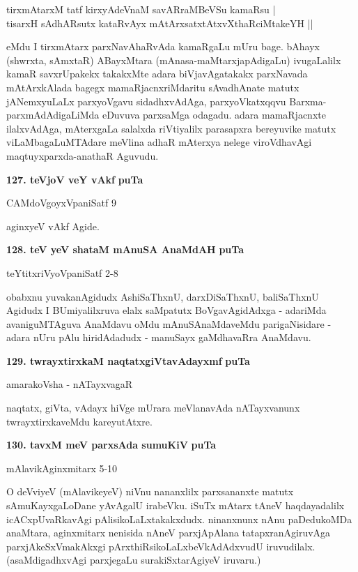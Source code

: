 \smallskip
\begin{shloka}
tirxmAtarxM tatf kirxyAdeVnaM savARraMBeVSu kamaRsu |\\
tisarxH sAdhARsutx kataRvAyx mAtArxsatxtAtxvXthaRciMtakeYH ||
\end{shloka}

eMdu I tirxmAtarx parxNavAhaRvAda kamaRgaLu mUru bage. bAhayx (shwrxta, sAmxtaR) ABayxM\-tara (mAnasa-maMtarxjapAdigaLu) ivugaLalilx kamaR savxrUpakekx takakxMte adara biVjavAgatakakx parxNavada mAtArx\-kAlada bagegx mamaRjacnxriMdaritu sAvadhAnate matutx jANemxyuLaLx parxyoVgavu sidadhxvAdAga, parxyoV\-katxqqvu Barxma-parxmAdAdigaLiMda eDuvuva parxsaMga odagadu. adara mamaRjacnxte ilalxvAdAga, mAterxgaLa salalxda riVtiyalilx parasapxra bereyuvike matutx viLaMbagaLuMTAdare meVlina adhaR mAterxya nelege viroVdhavAgi maqtuyxparxda-anathaR Aguvudu.

\medskip
\noindent
\textbf{127. teVjoV veY vAkf} \hfill{\bf puTa \pageref{212}}

\hfill{CAMdoVgoyxVpaniSatf 9}

aginxyeV vAkf Agide.

\medskip
\noindent
\textbf{128. teV yeV shataM mAnuSA AnaMdAH} \hfill{\bf puTa \pageref{166}}

\hfill{teYtitxriVyoVpaniSatf 2-8}

obabxnu yuvakanAgidudx AshiSaThxnU, darxDiSaThxnU, baliSaThxnU Agidudx I BUmiyalilxruva elalx saMpatutx\- BoVgavAgidAdxga - adariMda avaniguMTAguva AnaMdavu oMdu mAnuSAnaMdaveMdu parigaNisidare - adara nUru pAlu hiridAdadudx - manuSayx gaMdhavaRra AnaMdavu.

\eject

\noindent
\textbf{129. twrayxtirxkaM naqtatxgiVtavAdayxmf} \hfill{\bf puTa \pageref{241}}

\hfill{amarakoVsha - nATayxvagaR}

\smallskip
naqtatx, giVta, vAdayx hiVge mUrara meVlanavAda nATayxvanunx twrayxtirxkaveMdu kareyutAtxre.

\medskip
\noindent
\textbf{130. tavxM meV parxsAda sumuKiV} \hfill{\bf puTa \pageref{244}}

\hfill{mAlavikAginxmitarx 5-10}

\smallskip
O deVviyeV (mAlavikeyeV) niVnu nananxlilx parxsananxte matutx sAmuKayx\-gaLoDane yAvAgalU ira\-beVku. iSuTx mAtarx tAneV haqdayadalilx icACxpUvaRkavAgi pAlisikoLaLxtakakxdudx. ninanxnunx nAnu paDedu\-koMDa anaMtara, aginxmitarx nenisida nAneV parxjApAlana tatapxranAgiruvAga parxjAkeSxVmakAkxgi pArxthiRsikoLaLx\-beVkAdAdx\-vudU iruvudilalx. (asaMdigadhxvAgi parxjegaLu surakiSxtarAgiyeV iruvaru.)

